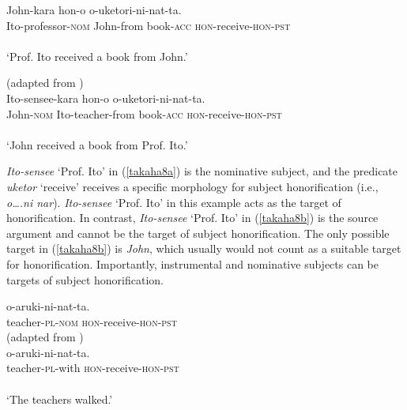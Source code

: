 \documentclass[output=paper]{langscibook}
\begin{document}
\begin{exe}
\ex 
\begin{xlist}
\ex \label{takaha8a}
 {John-kara} {hon-o} {o-uketori-ni-nat-ta}.\\
Ito-professor-\textsc{nom} John-from book-\textsc{acc} \textsc{hon}-receive-\textsc{hon}-\textsc{pst}\\\\
`Prof. Ito received a book from John.’      

\ex (adapted from \citealt[649]{Kishimoto2010}) \label{takaha8b}\\
 {Ito-sensee-kara} {hon-o} {o-uketori-ni-nat-ta}.\\
John-\textsc{nom} Ito-teacher-from book-\textsc{acc} \textsc{hon}-receive-\textsc{hon}-\textsc{pst}\\\\
`John received a book from Prof. Ito.’

\end{xlist}
\end{exe}

\emph{Ito-sensee} ‘Prof. Ito’ in (\ref{takaha8a}) is the nominative subject, and the predicate \emph{uketor} ‘receive’ receives a specific morphology for subject honorification (i.e., \emph{o….ni nar}). \emph{Ito-sensee} ‘Prof. Ito’ in this example acts as the target of honorification. In contrast, \emph{Ito-sensee} ‘Prof. Ito’ in (\ref{takaha8b}) is the source argument and cannot be the target of subject honorification. The only possible target in (\ref{takaha8b}) is \emph{John}, which usually would not count as a suitable target for honorification. Importantly, instrumental and nominative subjects can be targets of subject honorification.

\begin{exe}
\ex 
\begin{xlist}
\ex \label{takaha9a}
 {o-aruki-ni-nat-ta}.\\
teacher-\textsc{pl}-\textsc{nom} \textsc{hon}-receive-\textsc{hon}-\textsc{pst}\\


\ex (adapted from \citealt[649]{Kishimoto2010})\label{takaha9b}\\
 {o-aruki-ni-nat-ta}.\\
teacher-\textsc{pl}-with \textsc{hon}-receive-\textsc{hon}-\textsc{pst}\\\\
`The teachers walked.' 
\end{xlist}
\end{exe}
\end{document}
